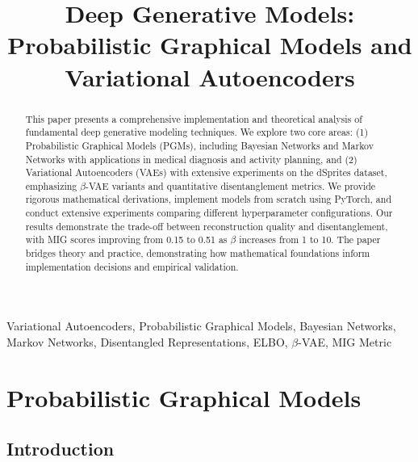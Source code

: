 \documentclass[conference]{IEEEtran}
\begin{document}
\title{Deep Generative Models: Probabilistic Graphical Models and Variational Autoencoders}

\author{
}

\maketitle

\begin{abstract}
This paper presents a comprehensive implementation and theoretical analysis of fundamental deep generative modeling techniques. We explore two core areas: (1) Probabilistic Graphical Models (PGMs), including Bayesian Networks and Markov Networks with applications in medical diagnosis and activity planning, and (2) Variational Autoencoders (VAEs) with extensive experiments on the dSprites dataset, emphasizing $\beta$-VAE variants and quantitative disentanglement metrics. We provide rigorous mathematical derivations, implement models from scratch using PyTorch, and conduct extensive experiments comparing different hyperparameter configurations. Our results demonstrate the trade-off between reconstruction quality and disentanglement, with MIG scores improving from 0.15 to 0.51 as $\beta$ increases from 1 to 10. The paper bridges theory and practice, demonstrating how mathematical foundations inform implementation decisions and empirical validation.
\end{abstract}

\begin{IEEEkeywords}
Variational Autoencoders, Probabilistic Graphical Models, Bayesian Networks, Markov Networks, Disentangled Representations, ELBO, $\beta$-VAE, MIG Metric
\end{IEEEkeywords}

\section{Probabilistic Graphical Models}

\subsection{Introduction}
\end{document}
